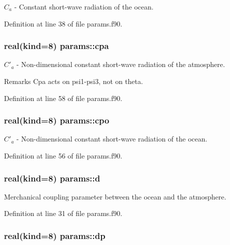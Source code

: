 $C_a$ -\/ Constant short-\/wave radiation of the ocean. 



Definition at line 38 of file params.\-f90.

\hypertarget{classparams_a5194d820b8962ee2b99a455a2892a2e2}{
\subsubsection[{cpa}]{\setlength{\rightskip}{0pt plus 5cm}real(kind=8) params\-::cpa}}\label{classparams_a5194d820b8962ee2b99a455a2892a2e2}


$C'_a$ -\/ Non-\/dimensional constant short-\/wave radiation of the atmosphere. 

\begin{DoxyRemark}{Remarks}
Cpa acts on psi1-\/psi3, not on theta. 
\end{DoxyRemark}


Definition at line 58 of file params.\-f90.

\hypertarget{classparams_a89b8bfb0d5a9275b0301c8ebe1a92da7}{
\subsubsection[{cpo}]{\setlength{\rightskip}{0pt plus 5cm}real(kind=8) params\-::cpo}}\label{classparams_a89b8bfb0d5a9275b0301c8ebe1a92da7}


$C'_a$ -\/ Non-\/dimensional constant short-\/wave radiation of the ocean. 



Definition at line 56 of file params.\-f90.

\hypertarget{classparams_a612e8c87d1d9514ebe7ab3ac95141be3}{
\subsubsection[{d}]{\setlength{\rightskip}{0pt plus 5cm}real(kind=8) params\-::d}}\label{classparams_a612e8c87d1d9514ebe7ab3ac95141be3}


Merchanical coupling parameter between the ocean and the atmosphere. 



Definition at line 31 of file params.\-f90.

\hypertarget{classparams_aee7fb664acd19367183ac09fdfe5ebe0}{
\subsubsection[{dp}]{\setlength{\rightskip}{0pt plus 5cm}real(kind=8) params\-::dp}}\label{classparams_aee7fb664acd19367183ac09fdfe5ebe0}


